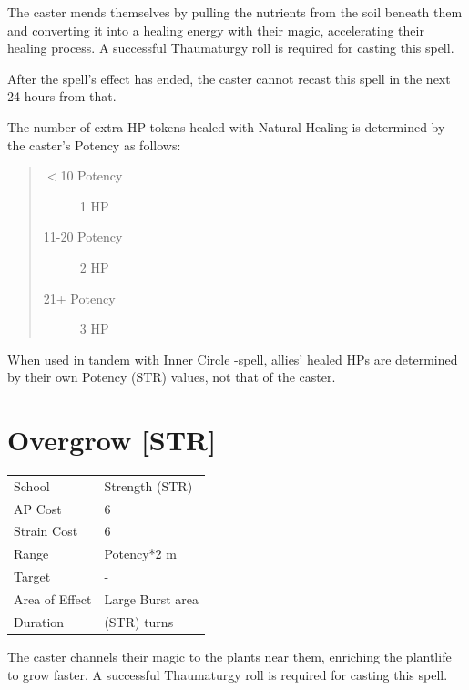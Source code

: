 \documentclass[11pt,a4paper,twocolumn]{book}
\begin{document}
\medskip

The caster mends themselves by pulling the nutrients from the soil beneath them and converting it into a healing energy with their magic, accelerating their healing process. A successful Thaumaturgy roll is required for casting this spell.

After the spell's effect has ended, the caster cannot recast this spell in the next 24 hours from that.

The number of extra HP tokens healed with Natural Healing is determined by the caster's Potency as follows:
\begin{quote}
  \begin{description}
    \item[$<$10 Potency] 	1 HP
    \item[11-20 Potency] 	2 HP
    \item[21+ Potency] 	3 HP
  \end{description}
\end{quote}

When used in tandem with Inner Circle -spell, allies' healed HPs are determined by their own Potency (STR) values, not that of the caster.

\vfill


\section*{Overgrow [STR]}
{
	\begin{tabu} to 75mm{| X[l,4] | X[l,7] |}
		\hline
		School 			& Strength (STR) 	\\
        AP Cost	      	& 6 				\\
        Strain Cost     & 6 				\\
        Range     		& Potency*2 m 		\\
        Target      	& -					\\
        Area of Effect  & Large Burst area 	\\
        Duration     	& (STR) turns 	\\ \hline
	\end{tabu}
		
}

\medskip

The caster channels their magic to the plants near them, enriching the plantlife to grow faster. A successful Thaumaturgy roll is required for casting this spell.
\end{document}
